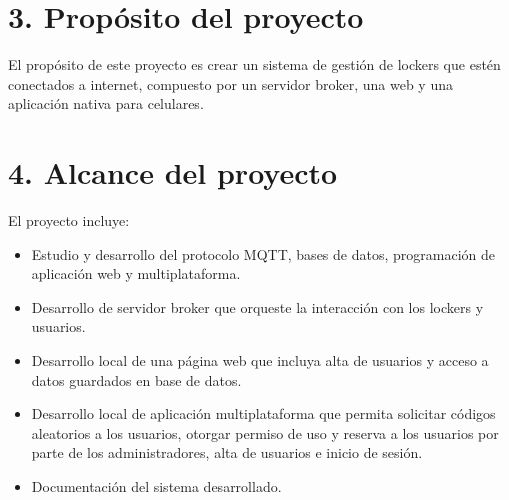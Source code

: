 \documentclass[
11pt, %
]{charter}
\begin{document}

 



\section{3. Propósito del proyecto}
\label{sec:proposito}

El propósito de este proyecto es crear un sistema de gestión de lockers que estén conectados a internet, compuesto por un servidor broker, una web y una aplicación nativa para celulares.

\section{4. Alcance del proyecto}
\label{sec:alcance}

El proyecto incluye:

\begin{itemize}
	\item Estudio y desarrollo del protocolo MQTT, bases de datos, programación de aplicación web y multiplataforma.
	\item Desarrollo de servidor broker que orqueste la interacción con los lockers y usuarios.
	\item Desarrollo local de una página web que incluya alta de usuarios y acceso a datos guardados en base de datos.
    \item Desarrollo local de aplicación multiplataforma que permita solicitar códigos aleatorios a los usuarios, otorgar permiso de uso y reserva a los usuarios por parte de los administradores, alta de usuarios e inicio de sesión.
    \item Documentación del sistema desarrollado.
\end{itemize}
\end{document}
